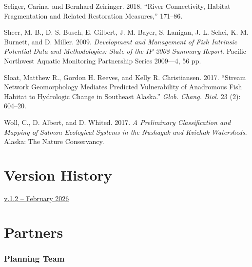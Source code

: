 \documentclass[
  letterpaper,
  DIV=11,
  numbers=noendperiod]{scrreprt}
\newlength{\cslhangindent}
\newlength{\cslentryspacingunit} %
\newenvironment{CSLReferences}[2] %
 {%
  \setlength{\parindent}{0pt}
  \ifodd #1
  \let\oldpar\par
  \def\par{\hangindent=\cslhangindent\oldpar}
  \fi
  \setlength{\parskip}{#2\cslentryspacingunit}
 }%
 {}
\begin{document}
\begin{CSLReferences}{1}{0}
\leavevmode{}%
Seliger, Carina, and Bernhard Zeiringer. 2018. {``River Connectivity,
Habitat Fragmentation and Related Restoration Measures,''} 171--86.

\leavevmode{}%
Sheer, M. B., D. S. Busch, E. Gilbert, J. M. Bayer, S. Lanigan, J. L.
Schei, K. M. Burnett, and D. Miller. 2009. \emph{Development and
Management of Fish Intrinsic Potential Data and Methodologies: State of
the {IP} 2008 Summary Report}. Pacific Northwest Aquatic Monitoring
Partnership Series 2009---4, 56 pp.

\leavevmode{}%
Sloat, Matthew R., Gordon H. Reeves, and Kelly R. Christiansen. 2017.
{``Stream Network Geomorphology Mediates Predicted Vulnerability of
Anadromous Fish Habitat to Hydrologic Change in Southeast Alaska.''}
\emph{Glob. Chang. Biol.} 23 (2): 604--20.

\leavevmode{}%
Woll, C., D. Albert, and D. Whited. 2017. \emph{A Preliminary
Classification and Mapping of Salmon Ecological Systems in the Nushagak
and Kvichak Watersheds}. Alaska: The Nature Conservancy.

\end{CSLReferences}


\hypertarget{version-history}{%
\chapter*{Version History}\label{version-history}}


\href{https://v1-0--horsefly-wcrp-test.netlify.app/}{v.1.2 -- February
2026}

\cleardoublepage
{}
{}
\appendix

\hypertarget{partners}{%
\chapter*{Partners}\label{partners}}


\hypertarget{planning-team}{%
\subsection*{Planning Team}\label{planning-team}}
\end{document}
